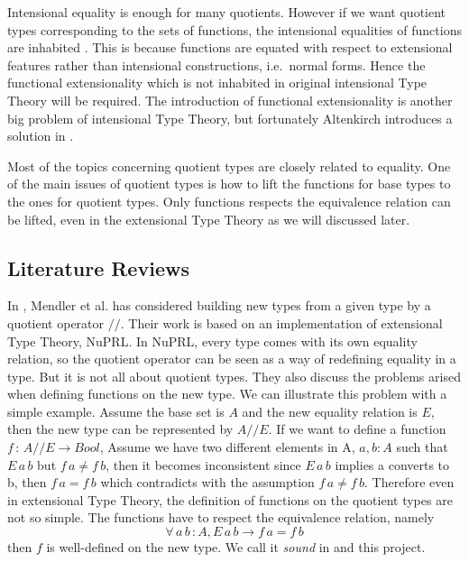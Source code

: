 \documentclass[envcountsame]{llncs}
\newcommand{\itt}{intensional Type Theory}
\newcommand{\ett}{extensional Type Theory}
\begin{document}
Intensional equality is enough for many quotients. However if
we want quotient types corresponding to the sets of functions, the
intensional equalities of functions are inhabited \cite{alt:99}. This
is because functions are equated with respect to extensional features
rather than intensional constructions, i.e.~normal forms.
Hence the functional extensionality which is not inhabited in original \itt{}
will be required. The introduction of functional extensionality is
another big problem of \itt{}, but fortunately Altenkirch introduces a
solution in \cite{alt:99}.

Most of the topics concerning quotient types are closely related to equality.
One of the main issues of quotient types is how to lift the functions for
base types to the ones for quotient types. Only functions respects the
equivalence relation can be lifted, even in the extensional Type
Theory as we will discussed later.

\subsection{Literature Reviews}

In \cite{cab}, Mendler et al. has considered building new types from a
given type by  a quotient operator $//$. Their work is based on an
implementation of extensional Type Theory, NuPRL. In NuPRL, every type
comes with its own equality relation, so the quotient operator can be
seen as a way of redefining equality in a type. But it is not all
about quotient types. They also discuss the problems arised when
defining functions on the new type.
We can illustrate this problem with a simple example. Assume the base
set is $A$ and the new equality relation is $E$, then the new
type can be represented by $A//E$. If we want to define a function $f
\,\colon\, A//E \to Bool$,  Assume we have two different elements in
A, $a, b \colon A$ such that $E\,a\,b$ but $f\,a \not= f\,b$, then it
becomes inconsistent since $E\,a\,b$ implies a converts to b, then
$f\,a = f\,b$ which contradicts with the assumption $f\,a \not=
f\,b$. Therefore even in \ett{}, the definition of functions on the
quotient types are not so simple. The functions have
to respect the equivalence relation, namely$$\forall \, a\,b\,\colon A, E\,a\,b \to f\,a = f\,b$$
then $f$ is well-defined on the new type. We call it \emph{sound} in
\cite{aan} and this project.
\end{document}
